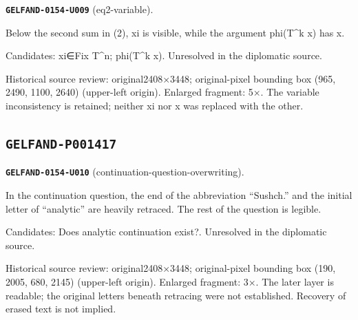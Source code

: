 \par\noindent\leavevmode{}\label{GELFAND-0154-U009}\textbf{\texttt{GELFAND-0154-U009}} (eq2-variable).\nopagebreak[4]\par
Below the second sum in (2), xi is visible, while the argument phi(T\textasciicircum{}k x) has x.\par
Candidates: xi∈Fix T\textasciicircum{}n; phi(T\textasciicircum{}k x). Unresolved in the diplomatic source.\par
Historical source review: original2408×3448; original-pixel bounding box (965, 2490, 1100, 2640) (upper-left origin). Enlarged fragment: 5×. The variable inconsistency is retained; neither xi nor x was replaced with the other.\par\medskip
\subsection*{\texttt{GELFAND-P001417}}
\par\noindent\leavevmode{}\label{GELFAND-0154-U010}\textbf{\texttt{GELFAND-0154-U010}} (continuation-question-overwriting).\nopagebreak[4]\par
In the continuation question, the end of the abbreviation “Sushch.” and the initial letter of “analytic” are heavily retraced. The rest of the question is legible.\par
Candidates: Does analytic continuation exist?. Unresolved in the diplomatic source.\par
Historical source review: original2408×3448; original-pixel bounding box (190, 2005, 680, 2145) (upper-left origin). Enlarged fragment: 3×. The later layer is readable; the original letters beneath retracing were not established. Recovery of erased text is not implied.\par\medskip

